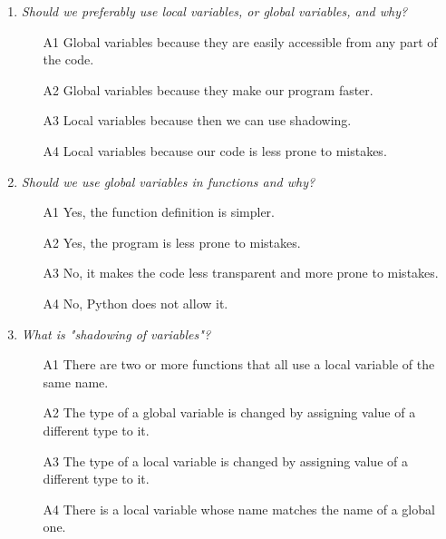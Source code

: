 \begin{enumerate}
\vspace{6mm}

\item {\em Should we preferably use local variables, or global variables, and why?}\\

\begin{enumerate}
\item[A1] Global variables because they are easily accessible from any part of the code.
\item[A2] Global variables because they make our program faster.
\item[A3] Local variables because then we can use shadowing.
\item[A4] Local variables because our code is less prone to mistakes. 
\end{enumerate}

\vspace{6mm}

\item {\em Should we use global variables in functions and why?}\\

\begin{enumerate}
\item[A1] Yes, the function definition is simpler.
\item[A2] Yes, the program is less prone to mistakes.
\item[A3] No, it makes the code less transparent and more prone to mistakes.
\item[A4] No, Python does not allow it.
\end{enumerate}

\vspace{6mm}

\item {\em What is "shadowing of variables"?}\\

\begin{enumerate}
\item[A1] There are two or more functions that all use a local variable of the same name.
\item[A2] The type of a global variable is changed by assigning value of a different type to it. 
\item[A3] The type of a local variable is changed by assigning value of a different type to it. 
\item[A4] There is a local variable whose name matches the name of a global one.
\end{enumerate}


\end{enumerate}
